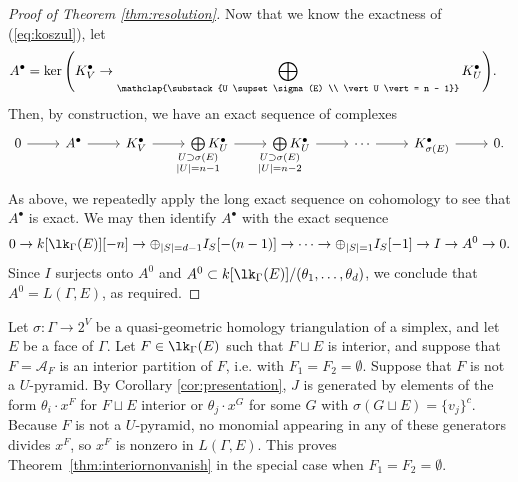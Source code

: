 \begin{proof}[Proof of Theorem \ref{thm:resolution}]
Now that we know the exactness of (\ref{eq:koszul}), let 
\begin{equation*} \begin{split}
A^{\bullet} &= \ker \Bigg( K_{V}^{\bullet} \to \bigoplus\limits_{\mathclap{\substack{U \supset \sigma(E) \\ \vert U \vert = n - 1}}} K_U^{\bullet} \Bigg).
\end{split}\end{equation*}
Then, by construction, we have an exact sequence of complexes 
\begin{equation*}
\begin{tikzcd}
0 \arrow[r] & A^{\bullet} \arrow[r] &K_{V}^{\bullet} \arrow[r] & \bigoplus\limits_{\mathclap{\substack{U \supset \sigma(E) \\ \vert U \vert = n - 1}}} K_U^{\bullet} \arrow[r] & \bigoplus\limits_{\mathclap{\substack{U \supset \sigma(E) \\ \vert U \vert = n - 2}}} K_U^{\bullet} \arrow[r] & \cdots \arrow[r] & K_{\sigma(E)}^{\bullet} \arrow[r] & 0.
\end{tikzcd}
\end{equation*}
As above, we repeatedly apply the long exact sequence on cohomology to see that $A^{\bullet}$ is exact. 
We may then identify $A^{\bullet}$ with the exact sequence
$$0  \to k[\lk_{\Gamma}(E)][-n] \to \oplus_{ |S|  = d - 1 } I_{S}[-(n-1)] \to \dotsb  \to \oplus_{|S| = 1} I_{S}[-1] \to I \to A^0 \to 0.$$ Since $I$ surjects onto $A^0$ and $A^0 \subset k[\lk_{\Gamma}(E)]/(\theta_1, \dotsc, \theta_{d})$, we conclude that $A^0 = L(\Gamma,E)$, as required.
\end{proof}

\begin{remark}\label{r:specialcase}
Let $\sigma\colon \Gamma \to 2^V$ be a quasi-geometric homology triangulation of a simplex, and let $E$ be a face of $\Gamma$. Let $F \in \lk_\Gamma(E)$ such that $F \sqcup E$ is interior, and suppose that $F = \mathcal{A}_F$ is an interior partition of $F$, i.e. with $F_1 = F_2 = \emptyset$. Suppose that $F$ is not a $U$-pyramid.  
By Corollary \ref{cor:presentation}, $J$ is generated by elements of the form $\theta_i \cdot x^{F}$ for $F \sqcup E$ interior or $\theta_j \cdot x^G$ for some $G$ with $\sigma(G \sqcup E) = \{v_j\}^c$. Because $F$ is not a $U$-pyramid, no monomial appearing in any of these generators divides $x^F$, so $x^F$ is nonzero in $L(\Gamma, E)$. 
This proves Theorem~\ref{thm:interiornonvanish} in the special case when $F_1 = F_2 = \emptyset$. 
\end{remark}



